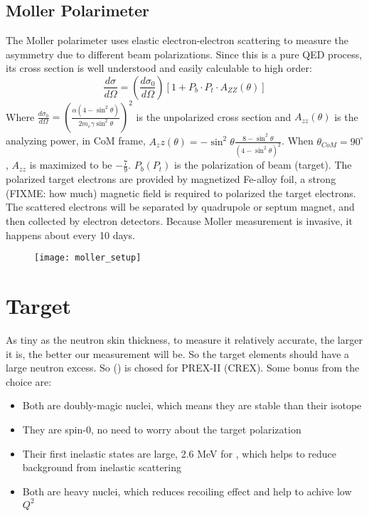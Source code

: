 \subsection{Moller Polarimeter}
The Moller polarimeter uses elastic electron-electron scattering to measure the
asymmetry due to different beam polarizations. Since this is a pure QED process,
its cross section is well understood and easily calculable to high order:
\begin{equation*}
    \frac{d\sigma}{d\Omega} = \left( \frac{d\sigma_0}{d\Omega} \right) [ 1 + P_b \cdot P_t \cdot A_{ZZ}(\theta)]
\end{equation*}
Where $\frac{d\sigma_0}{d\Omega} = \left( \frac{\alpha(4 - \sin^2\theta)}{2m_e\gamma\sin^2\theta }\right)^2$ is the unpolarized cross section and $A_{zz}(\theta)$ is the analyzing power, 
in CoM frame, $A_zz(\theta) = -\sin^2\theta \frac{8 - \sin^2\theta}{(4-\sin^2\theta)^2}$.
When $\theta_{CoM} = 90^\circ$, $A_{zz}$ is maximized to be $-\frac{7}{9}$.
$P_b (P_t)$ is the polarization of beam (target). The polarized target electrons
are provided by magnetized Fe-alloy foil, a strong (FIXME: how much) magnetic 
field is required to polarized the target electrons. The scattered electrons will
be separated by quadrupole or septum magnet, and then collected by electron 
detectors. Because Moller measurement is invasive, it happens about every 10 days.
\begin{figure}[h!]
    \centering
    \texttt{[image: moller\_setup]}
\end{figure}

\section{Target}
As tiny as the neutron skin thickness, to measure it relatively accurate, the
larger it is, the better our measurement will be. So the target elements should
have a large neutron excess. So \Pb (\Ca) is chosed for PREX-II (CREX). Some
bonus from the choice are:
\begin{itemize}
    \item Both are doubly-magic nuclei, which means they are stable than their
	isotope
    \item They are spin-0, no need to worry about the target polarization
    \item Their first inelastic states are large, 2.6 MeV for \Ca, which helps
	to reduce background from inelastic scattering
    \item Both are heavy nuclei, which reduces recoiling effect and help
	to achive low $Q^2$
\end{itemize}

